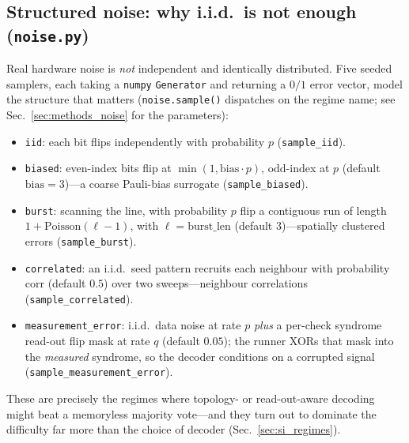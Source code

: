 \documentclass[reprint,aps,prxquantum,amsmath,amssymb,floatfix,nofootinbib,longbibliography]{revtex4-2}
\theoremstyle{definition}
\theoremstyle{remark}
\theoremstyle{plain}
\begin{document}
\subsection{Structured noise: why i.i.d.\ is not enough (\texttt{noise.py})}
\label{sec:si_noise}
Real hardware noise is \emph{not} independent and identically distributed. Five seeded samplers, each taking a \texttt{numpy} \texttt{Generator} and returning a $0/1$ error vector, model the structure that matters (\texttt{noise.sample()} dispatches on the regime name; see Sec.~\ref{sec:methods_noise} for the parameters):
\begin{itemize}[leftmargin=1.5em]
  \item \texttt{iid}: each bit flips independently with probability $p$ (\texttt{sample\_iid}).
  \item \texttt{biased}: even-index bits flip at $\min(1,\mathrm{bias}\cdot p)$, odd-index at $p$ (default $\mathrm{bias}=3$)---a coarse Pauli-bias surrogate (\texttt{sample\_biased}).
  \item \texttt{burst}: scanning the line, with probability $p$ flip a contiguous run of length $1+\mathrm{Poisson}(\ell-1)$, with $\ell=\mathrm{burst\_len}$ (default $3$)---spatially clustered errors (\texttt{sample\_burst}).
  \item \texttt{correlated}: an i.i.d.\ seed pattern recruits each neighbour with probability $\mathrm{corr}$ (default $0.5$) over two sweeps---neighbour correlations (\texttt{sample\_correlated}).
  \item \texttt{measurement\_error}: i.i.d.\ data noise at rate $p$ \emph{plus} a per-check syndrome read-out flip mask at rate $q$ (default $0.05$); the runner XORs that mask into the \emph{measured} syndrome, so the decoder conditions on a corrupted signal (\texttt{sample\_measurement\_error}).
\end{itemize}
These are precisely the regimes where topology- or read-out-aware decoding might beat a memoryless majority vote---and they turn out to dominate the difficulty far more than the choice of decoder (Sec.~\ref{sec:si_regimes}).
\end{document}
